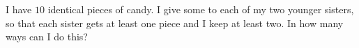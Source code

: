 I have $10$ identical pieces of candy. I give some to each of my two younger sisters, so that each sister gets at least one piece and I keep at least two. In how many ways can I do this?
